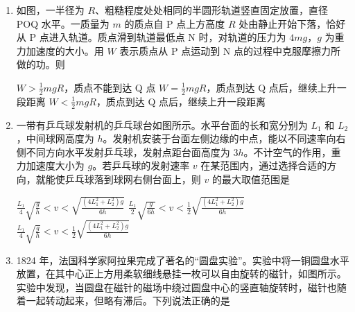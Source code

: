 \documentclass[\gkver]{gaokaozhenti}
\begin{document}
\begin{enumerate}
{$U=22\UV$，$k=\frac{1}{9}$}
{$U=66\UV$，$k=\frac{1}{3}$}
{$U=22\UV$，$k=\frac{1}{3}$}


\item
如图，一半径为 $R$、粗糙程度处处相同的半圆形轨道竖直固定放置，直径 POQ 水平。一质量为 $m$ 的质点自 P 点上方高度 $R$ 处由静止开始下落，恰好从 P 点进入轨道。质点滑到轨道最低点 N 时，对轨道的压力为 $4mg$，$g$ 为重力加速度的大小。用 $W$ 表示质点从 P 点运动到 N 点的过程中克服摩擦力所做的功。则

\onepicture[w=3.42cm]{}

{$W>\frac{1}{2}mgR$，质点不能到达 Q 点}
{$W=\frac{1}{2}mgR$，质点到达 Q 点后，继续上升一段距离}
{$W<\frac{1}{2}mgR$，质点到达 Q 点后，继续上升一段距离}


\item
一带有乒乓球发射机的乒乓球台如图所示。水平台面的长和宽分别为 $L_{1}$ 和 $L_{2}$，中间球网高度为 $h$。发射机安装于台面左侧边缘的中点，能以不同速率向右侧不同方向水平发射乒乓球，发射点距台面高度为 $3h$。不计空气的作用，重力加速度大小为 $g$。若乒乓球的发射速率 $v$ 在某范围内，通过选择合适的方向，就能使乒乓球落到球网右侧台面上，则 $v$ 的最大取值范围是

\onepicture[w=5.96cm]{}

{$\frac{L_{1}}{4}\sqrt{\frac{g}{h}}<v<\sqrt{\frac{(4L_{1}^{2}+L_{2}^{2})g}{6h}}$}
{$\frac{L_{1}}{2}\sqrt{\frac{g}{6h}}<v<\frac{1}{2}\sqrt{\frac{(4L_{1}^{2}+L_{2}^{2})g}{6h}}$}
{$\frac{L_{1}}{4}\sqrt{\frac{g}{h}}<v<\frac{1}{2}\sqrt{\frac{(4L_{1}^{2}+L_{2}^{2})g}{6h}}$}


\item
1824 年，法国科学家阿拉果完成了著名的“圆盘实验”。实验中将一铜圆盘水平放置，在其中心正上方用柔软细线悬挂一枚可以自由旋转的磁针，如图所示。实验中发现，当圆盘在磁针的磁场中绕过圆盘中心的竖直轴旋转时，磁针也随着一起转动起来，但略有滞后。下列说法正确的是


\end{enumerate}
\end{document}
